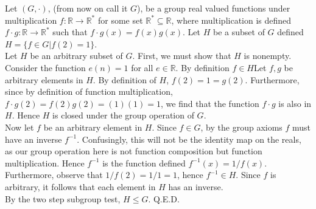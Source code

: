 \documentclass{article}
\newcommand{\R}{\mathbb{R}}
\begin{document}
 Let $(G,\cdot)$, (from now on call it $G$), be a group real valued functions under multiplication $f:\R\rightarrow\R^*$ for some set $\R^*\subseteq \R$, where multiplication is defined $f\cdot g:\R\rightarrow \R^*$ such that $f\cdot g(x) = f(x)g(x)$. Let $H$ be a subset of $G$ defined $H = \{f\in G| f(2) = 1\}$.\\

 Let $H$ be an arbitrary subset of $G$.
First, we must show that $H$ is nonempty. Consider the function $e(n) = 1$ for all $e\in \R$. By definition $f\in H$Let $f,g$ be arbitrary elements in $H$. By definition of $H$, $f(2) = 1 = g(2)$. Furthermore, since by definition of function multiplication, $f\cdot g(2) = f(2)g(2) = (1)(1) = 1$, we find that the function $f\cdot g$ is also in $H$. Hence $H$ is closed under the group operation of $G$.\\
Now let $f$ be an arbitrary element in $H$. Since $f\in G$, by the group axioms $f$ must have an inverse $f^{-1}$. Confusingly, this will not be the identity map on the reals, as our group operation here is not function composition but function multiplication. Hence $f^{-1}$ is the function defined $f^{-1}(x) = 1/f(x).$ Furthermore, observe that $1/f(2) = 1/1 = 1$, hence $f^{-1}\in H$. Since $f$ is arbitrary, it follows that each element in $H$ has an inverse.\\
By the two step subgroup test, $H\le G$. Q.E.D.
\end{document}
